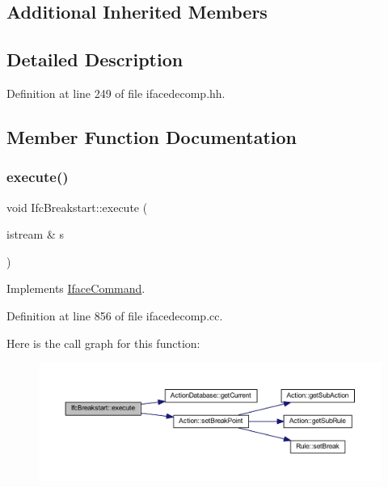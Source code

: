 \subsection*{Additional Inherited Members}


\subsection{Detailed Description}


Definition at line 249 of file ifacedecomp.\+hh.



\subsection{Member Function Documentation}
\mbox{\label{class_ifc_breakstart_a501a27b150ccb020030d0b0156890353}} 
\subsubsection{\texorpdfstring{execute()}{execute()}}
{\footnotesize\ttfamily void Ifc\+Breakstart\+::execute (\begin{DoxyParamCaption}\item[{istream \&}]{s }\end{DoxyParamCaption})\hspace{0.3cm}{\ttfamily [virtual]}}



Implements \mbox{\hyperlink{class_iface_command_af10e29cee2c8e419de6efe9e680ad201}{Iface\+Command}}.



Definition at line 856 of file ifacedecomp.\+cc.

Here is the call graph for this function\+:
\nopagebreak
\begin{figure}[H]
\begin{center}
\leavevmode
\includegraphics[width=350pt]{class_ifc_breakstart_a501a27b150ccb020030d0b0156890353_cgraph}
\end{center}
\end{figure}


